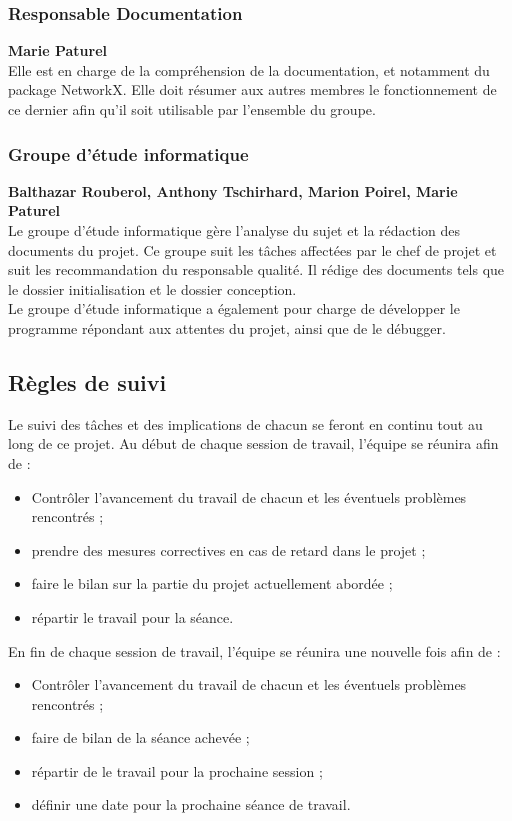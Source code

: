 \subsubsection{Responsable Documentation}
\textbf{Marie Paturel}\\
Elle est en charge de la compréhension de la documentation, et notamment du package NetworkX. Elle doit résumer aux autres membres le fonctionnement de ce dernier afin qu'il soit utilisable par l'ensemble du groupe.

\subsubsection{Groupe d'étude informatique}
\textbf{Balthazar Rouberol, Anthony Tschirhard, Marion Poirel, Marie Paturel}\\
Le groupe d'étude informatique gère l'analyse du sujet et la rédaction des documents du projet. Ce groupe suit les tâches affectées par le chef de projet et suit les recommandation du responsable qualité. Il rédige des documents tels que le dossier initialisation et le dossier conception.\\
Le groupe d'étude informatique a également pour charge de développer le programme répondant aux attentes du projet, ainsi que de le débugger.


\subsection{Règles de suivi}
Le suivi des tâches et des implications de chacun se feront en continu tout au long de ce projet. Au début de chaque session de travail, l'équipe se réunira afin de :
\begin{itemize}
  \item Contrôler l'avancement du travail de chacun et les éventuels problèmes rencontrés ;
  \item prendre des mesures correctives en cas de retard dans le projet ;
  \item faire le bilan sur la partie du projet actuellement abordée ;
  \item répartir le travail pour la séance.
\end{itemize}
En fin de chaque session de travail, l'équipe se réunira une nouvelle fois afin de :
\begin{itemize}
  \item Contrôler l'avancement du travail de chacun et les éventuels problèmes rencontrés ;
  \item faire de bilan de la séance achevée ;
  \item répartir de le travail pour la prochaine session ;
  \item définir une date pour la prochaine séance de travail.
\end{itemize}

